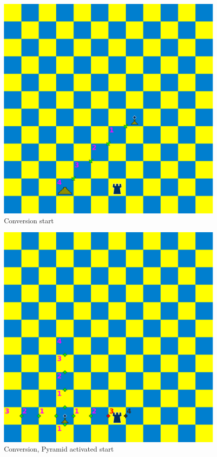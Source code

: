 \documentclass[a5paper,12pt,draft]{book} %
\begin{document}
\clearpage

\noindent
\begin{figure}[!h]
\includegraphics[width=1.0\textwidth, keepaspectratio=true]{../gfx/examples/07_move_pyramid_conversion_init.png}
\caption{Conversion start}
\label{fig:ma_conversion_init}
\end{figure}

\clearpage

\noindent
\begin{figure}[!h]
\includegraphics[width=1.0\textwidth, keepaspectratio=true]{../gfx/examples/08_move_pyramid_conversion_activated.png}
\caption{Conversion, Pyramid activated start}
\label{fig:ma_conversion_activated}
\end{figure}
\end{document}
